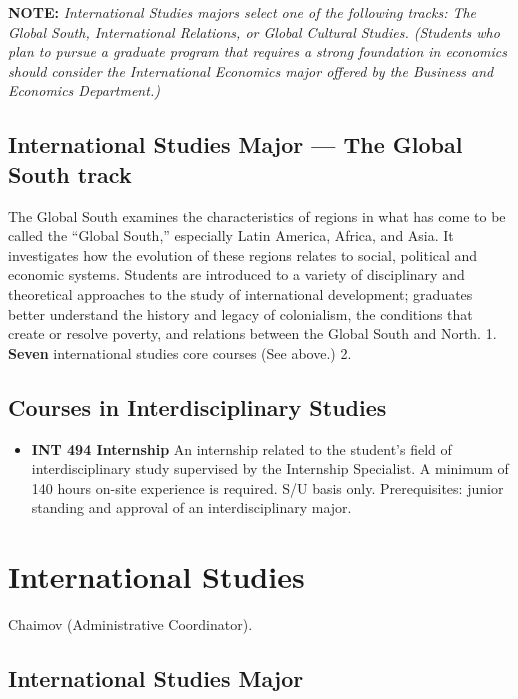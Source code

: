 \documentclass[
  letterpaper,
]{scrbook}
\providecommand{\tightlist}{%
  \setlength{\itemsep}{0pt}\setlength{\parskip}{0pt}}
\begin{document}
\textbf{NOTE:} \emph{International Studies majors select one of the
following tracks: The Global South, International Relations, or Global
Cultural Studies. (Students who plan to pursue a graduate program that
requires a strong foundation in economics should consider the
International Economics major offered by the Business and Economics
Department.)}

\subsection{International Studies Major --- The Global South
track}\label{international-studies-major-the-global-south-track}

The Global South examines the characteristics of regions in what has
come to be called the ``Global South,'' especially Latin America,
Africa, and Asia. It investigates how the evolution of these regions
relates to social, political and economic systems. Students are
introduced to a variety of disciplinary and theoretical approaches to
the study of international development; graduates better understand the
history and legacy of colonialism, the conditions that create or resolve
poverty, and relations between the Global South and North. 1.
\textbf{Seven} international studies core courses (See above.) 2.

\subsection{Courses in Interdisciplinary
Studies}\label{courses-in-interdisciplinary-studies-1}

\begin{itemize}
\tightlist
\item
  \textbf{INT 494 Internship} An internship related to the student's
  field of interdisciplinary study supervised by the Internship
  Specialist. A minimum of 140 hours on-site experience is required. S/U
  basis only. Prerequisites: junior standing and approval of an
  interdisciplinary major.
\end{itemize}

\section{International Studies}\label{sec-international-studies}

Chaimov (Administrative Coordinator).

\subsection{International Studies
Major}\label{international-studies-major-1}
\end{document}
